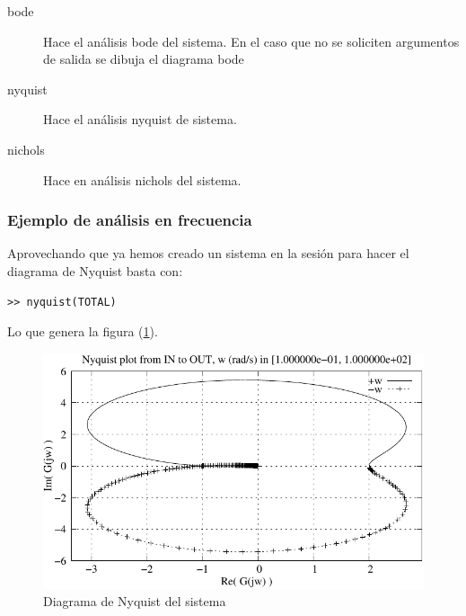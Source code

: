 \begin{description}
\item [bode]Hace el análisis bode del sistema. En el caso
que no se soliciten argumentos de salida se dibuja el diagrama bode 
\item [nyquist]Hace el análisis nyquist de sistema. 
\item [nichols]Hace en análisis nichols del sistema. 
\end{description}

\subsubsection{Ejemplo de análisis en frecuencia}

\label{sec:ejercicioanalisis} Aprovechando que ya hemos creado un
sistema en la sesión para hacer el diagrama de Nyquist basta con:
\begin{verbatim}
>> nyquist(TOTAL)
\end{verbatim} Lo que genera la figura (\ref{fig:nyquist}). %
\begin{figure}
 \centering
    \includegraphics[width=12cm, keepaspectratio]{figuras/nyquist}


\caption{\label{fig:nyquist}Diagrama de Nyquist del sistema}
\end{figure}


